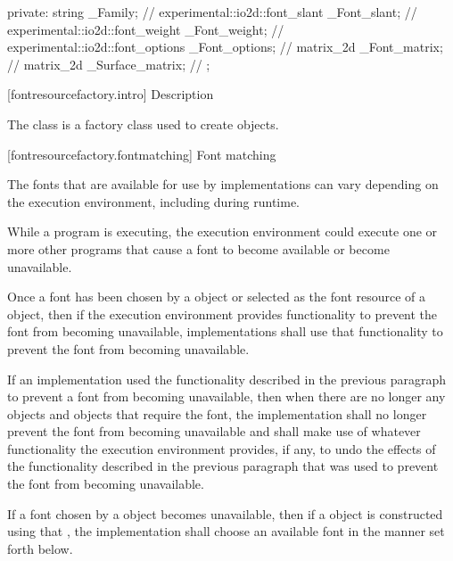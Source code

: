 \begin{codeblock}
{{{{{  private:
    string _Family;                                 // \expos
    experimental::io2d::font_slant _Font_slant;     // \expos
    experimental::io2d::font_weight _Font_weight;   // \expos
    experimental::io2d::font_options _Font_options; // \expos
    matrix_2d _Font_matrix;                         // \expos
    matrix_2d _Surface_matrix;                      // \expos
  };
} } } }
\end{codeblock}

 [fontresourcefactory.intro] { Description}

\pnum
{}
The  class is a factory class used to create  objects.

 [fontresourcefactory.fontmatching] {Font matching}

\pnum
The fonts that are available for use by implementations can vary depending on the execution environment, including during runtime.

\pnum
\enterexample
While a program is executing, the execution environment could execute one or more other programs that cause a font to become available or become unavailable.
\exitexample

\pnum
Once a font has been chosen by a  object or selected as the font resource of a  object, then if the execution environment provides functionality to prevent the font from becoming unavailable, implementations shall use that functionality to prevent the font from becoming unavailable.

\pnum
If an implementation used the functionality described in the previous paragraph to prevent a font from becoming unavailable, then when there are no longer any  objects and  objects that require the font, the implementation shall no longer prevent the font from becoming unavailable and shall make use of whatever functionality the execution environment provides, if any, to undo the effects of the functionality described in the previous paragraph that was used to prevent the font from becoming unavailable.

\pnum
If a font chosen by a  object becomes unavailable, then if a  object is constructed using that , the implementation shall choose an available font in the manner set forth below.

